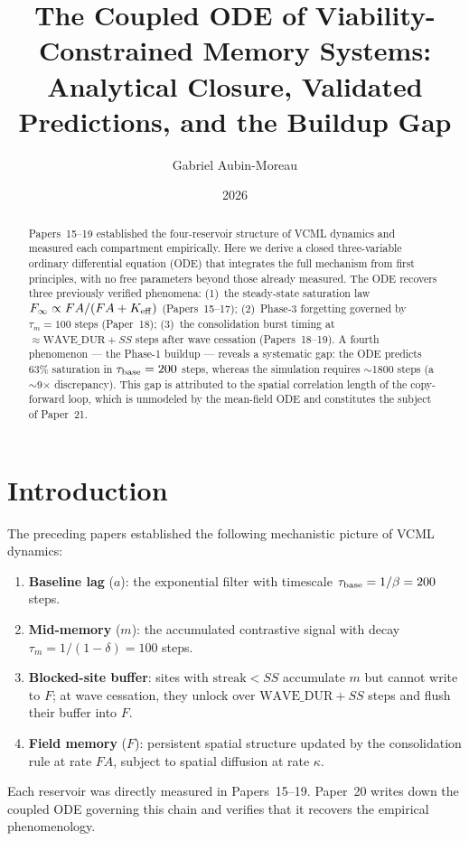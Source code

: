 \documentclass[11pt]{article}
\title{The Coupled ODE of Viability-Constrained Memory Systems:\\
       Analytical Closure, Validated Predictions, and the Buildup Gap}
\author{Gabriel Aubin-Moreau}
\date{2026}
\begin{document}
\maketitle

\begin{abstract}
Papers~15--19 established the four-reservoir structure of VCML dynamics and measured each
compartment empirically.
Here we derive a closed three-variable ordinary differential equation (ODE) that integrates
the full mechanism from first principles, with no free parameters beyond those already
measured.
The ODE recovers three previously verified phenomena:
(1)~the steady-state saturation law $F_\infty \propto FA/(FA + K_{\rm eff})$ (Papers~15--17);
(2)~Phase-3 forgetting governed by $\tau_m = 100$ steps (Paper~18);
(3)~the consolidation burst timing at $\approx \mathrm{WAVE\_DUR} + SS$ steps after wave
cessation (Papers~18--19).
A fourth phenomenon --- the Phase-1 buildup --- reveals a systematic gap:
the ODE predicts 63\% saturation in $\tau_{\rm base} = 200$ steps,
whereas the simulation requires $\sim$1800 steps (a $\sim$9$\times$ discrepancy).
This gap is attributed to the spatial correlation length of the copy-forward loop,
which is unmodeled by the mean-field ODE and constitutes the subject of Paper~21.
\end{abstract}

\section{Introduction}

The preceding papers established the following mechanistic picture of VCML dynamics:
\begin{enumerate}
  \item \textbf{Baseline lag} ($a$): the exponential filter with timescale
    $\tau_{\rm base} = 1/\beta = 200$ steps.
  \item \textbf{Mid-memory} ($m$): the accumulated contrastive signal with decay
    $\tau_m = 1/(1-\delta) = 100$ steps.
  \item \textbf{Blocked-site buffer}: sites with $\mathrm{streak} < SS$ accumulate $m$
    but cannot write to $F$; at wave cessation, they unlock over $\mathrm{WAVE\_DUR} + SS$
    steps and flush their buffer into $F$.
  \item \textbf{Field memory} ($F$): persistent spatial structure updated by the
    consolidation rule at rate $FA$, subject to spatial diffusion at rate $\kappa$.
\end{enumerate}
Each reservoir was directly measured in Papers~15--19.
Paper~20 writes down the coupled ODE governing this chain and verifies that it recovers
the empirical phenomenology.
\end{document}
